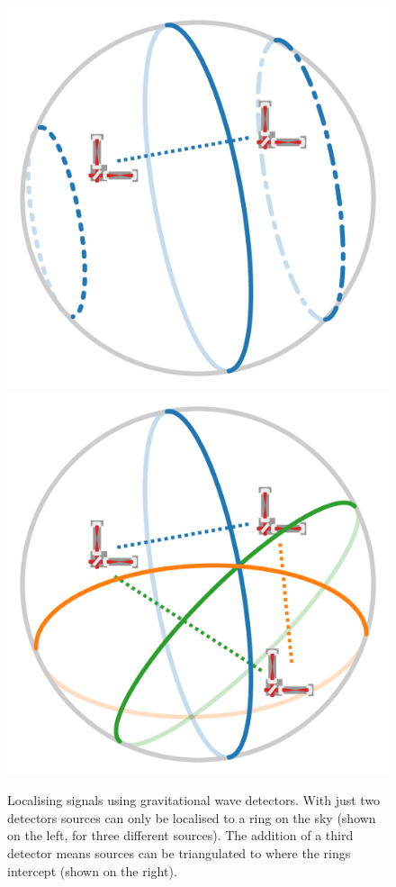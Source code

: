 \begin{colsection}
\begin{colsection}
\begin{figure}[t]
    \begin{center}
        \includegraphics[width=0.4\linewidth]{images/triangulate_1.pdf}
        \includegraphics[width=0.4\linewidth]{images/triangulate_2.pdf}
    \end{center}
    \caption[Localising signals using gravitational wave detectors]{
        Localising signals using gravitational wave detectors. With just two detectors sources can only be localised to a ring on the sky (shown on the left, for three different sources). The addition of a third detector means sources can be triangulated to where the rings intercept (shown on the right).
        }\label{fig:triangulate}
\end{figure}


\end{colsection}
\end{colsection}

